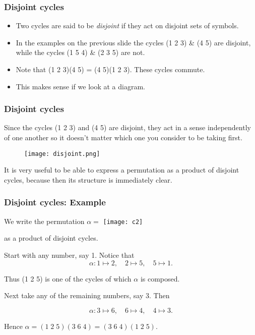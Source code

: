 \documentclass{beamer}
\begin{document}
\begin{frame}
  \frametitle{Disjoint cycles}
  \begin{itemize}
  \item Two cycles are said to be \textit{disjoint} if they act on disjoint sets of symbols. 

\item In the examples on the previous slide the cycles (1 2 3) \& (4 5) are disjoint, while the cycles (1 5 4) \& (2 3 5) are not.

\item Note  that (1 2 3)(4 5) = (4 5)(1 2 3). These cycles commute. 

\item This makes sense if we look at a diagram.
  \end{itemize}


\end{frame}
\begin{frame}
  \frametitle{Disjoint cycles}
   Since the cycles (1 2 3) and (4 5) are disjoint, they act in a sense independently of one another so it doesn't matter which one you consider to be taking first.

\begin{figure}[h]
  \centering
  \texttt{[image: disjoint.png]}
\end{figure} 
 It is very useful to be able to express a permutation as a product of disjoint cycles, because then its structure is immediately clear. 
\end{frame}



\begin{frame}
  \frametitle{Disjoint cycles: Example}
We write the permutation $\alpha = $ \texttt{[image: c2]}

as a product of disjoint cycles. 

Start with any number, say 1. Notice that 
\begin{equation*}
  \label{eq:1}
  \alpha: 1 \mapsto 2, \quad 2 \mapsto 5,\quad 5 \mapsto 1. 
\end{equation*}

Thus (1 2 5) is one of the cycles of which $\alpha$ is composed.

Next take any of the remaining numbers, say 3. Then

\begin{equation*}
  \alpha: 3 \mapsto 6,\quad 6 \mapsto 4,\quad 4 \mapsto  3.
\end{equation*}

Hence $\alpha = (1 \; 2 \; 5)(3 \; 6 \; 4) = (3 \; 6 \; 4)(1 \; 2 \; 5).$

\end{frame}
\end{document}
